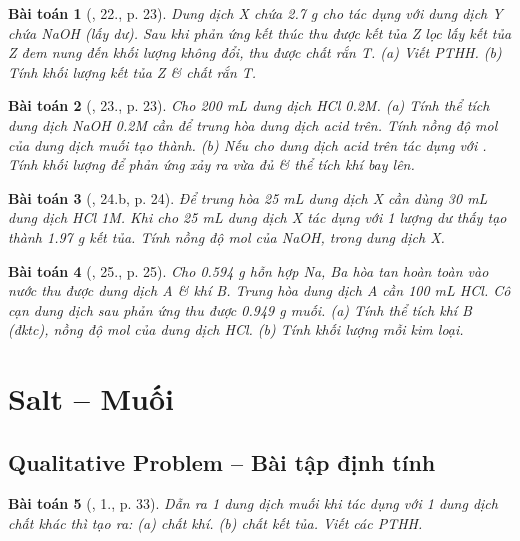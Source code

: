 \documentclass{article}
\newtheorem{baitoan}{Bài toán}
\begin{document}
\begin{baitoan}[\cite{An_350_BT_Hoa_Hoc_9}, 22., p. 23]
	Dung dịch X chứa \emph{2.7 g } cho tác dụng với dung dịch Y chứa \emph{NaOH} (lấy dư). Sau khi phản ứng kết thúc thu được kết tủa Z lọc lấy kết tủa Z đem nung đến khối lượng không đổi, thu được chất rắn T. (a) Viết PTHH. (b) Tính khối lượng kết tủa Z \& chất rắn T.
\end{baitoan}

\begin{baitoan}[\cite{An_350_BT_Hoa_Hoc_9}, 23., p. 23]
	Cho \emph{200 mL} dung dịch \emph{HCl 0.2M}. (a) Tính thể tích dung dịch \emph{NaOH 0.2M} cần để trung hòa dung dịch acid trên. Tính nồng độ mol của dung dịch muối tạo thành. (b) Nếu cho dung dịch acid trên tác dụng với \emph{}. Tính khối lượng \emph{} để phản ứng xảy ra vừa đủ \& thể tích khí bay lên.
\end{baitoan}

\begin{baitoan}[\cite{An_350_BT_Hoa_Hoc_9}, 24.b, p. 24]
	Để trung hòa \emph{25 mL} dung dịch X cần dùng \emph{30 mL} dung dịch \emph{HCl 1M}. Khi cho \emph{25 mL} dung dịch X tác dụng với 1 lượng dư \emph{} thấy tạo thành \emph{1.97 g} kết tủa. Tính nồng độ mol của \emph{NaOH, } trong dung dịch X.
\end{baitoan}

\begin{baitoan}[\cite{An_350_BT_Hoa_Hoc_9}, 25., p. 25]
	Cho \emph{0.594 g} hỗn hợp \emph{Na, Ba} hòa tan hoàn toàn vào nước thu được dung dịch A \& khí B. Trung hòa dung dịch A cần \emph{100 mL HCl}. Cô cạn dung dịch sau phản ứng thu được \emph{0.949 g} muối. (a) Tính thể tích khí B (đktc), nồng độ mol của dung dịch \emph{HCl}. (b) Tính khối lượng mỗi kim loại.
\end{baitoan}


\section{Salt -- Muối}

\subsection{Qualitative Problem -- Bài tập định tính}

\begin{baitoan}[\cite{SGK_Hoa_Hoc_9}, 1., p. 33]
	Dẫn ra 1 dung dịch muối khi tác dụng với 1 dung dịch chất khác thì tạo ra: (a) chất khí. (b) chất kết tủa. Viết các PTHH.
\end{baitoan}
\end{document}
